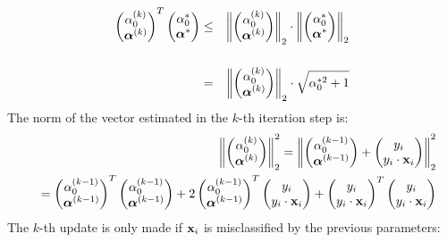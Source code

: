   \begin{eqnarray*}
    \begin{pmatrix}\alpha_0^{(k)}\\ \bm{\mathrm{\alpha}}^{(k)}\end{pmatrix}^T\begin{pmatrix}\alpha_0^*\\ \bm{\mathrm{\alpha}}^*\end{pmatrix} 
      &\leq& \left\|  \begin{pmatrix}\alpha_0^{(k)}\\ \bm{\mathrm{\alpha}}^{(k)}\end{pmatrix}\right\|_2\cdot  \left\| \begin{pmatrix}\alpha_0^*\\ \bm{\mathrm{\alpha}}^*\end{pmatrix}\right\|_2 \\[.5cm]          
      &=&\left \|  \begin{pmatrix}\alpha_0^{(k)}\\ \bm{\mathrm{\alpha}}^{(k)}\end{pmatrix}\right\|_2\cdot  \sqrt{\alpha_0^{*2}+1}
  \end{eqnarray*}
  The norm of the vector estimated in the $k$-th iteration step is:
  \begin{eqnarray*}
    & &  \left \|  \begin{pmatrix}\alpha_0^{(k)}\\ \vect \alpha^{(k)}\end{pmatrix}\right\|_2^2 =
   \left\| \begin{pmatrix}\alpha_0^{(k-1)}\\ \vect \alpha^{(k-1)}\end{pmatrix} +  \begin{pmatrix}y_i\\ y_i\cdot \vect x_i\end{pmatrix}\right\|_2^2 \\         
   & & \vspace*{-2cm} = \begin{pmatrix}\alpha_0^{(k-1)}\\ \vect \alpha^{(k-1)}\end{pmatrix} ^T\begin{pmatrix}\alpha_0^{(k-1)}\\ \vect \alpha^{(k-1)}\end{pmatrix} 
           + 2 \begin{pmatrix}\alpha_0^{(k-1)}\\ \vect \alpha^{(k-1)}\end{pmatrix}^T\begin{pmatrix}y_i\\ y_i\cdot \vect x_i\end{pmatrix}
          + \begin{pmatrix}y_i\\ y_i\cdot \vect x_i\end{pmatrix}^T\begin{pmatrix}y_i\\ y_i\cdot \vect x_i\end{pmatrix}
  \end{eqnarray*}
  The $k$-th update is only made if $\bm{\mathrm{x}}_i$ is misclassified by the previous parameters:
  
